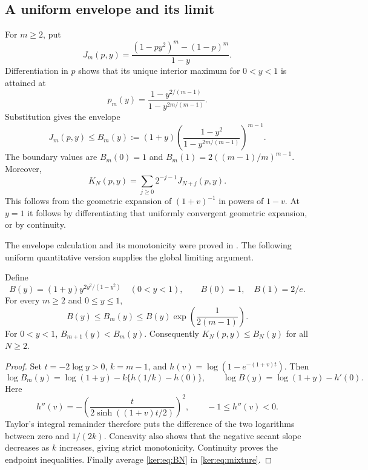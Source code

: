 \subsection{A uniform envelope and its limit}
For $m\ge2$, put
\[
 J_m(p,y)=\frac{(1-py^2)^m-(1-p)^m}{1-y}.
\]
Differentiation in $p$ shows that its unique interior maximum for
$0<y<1$ is attained at
\[
 p_m(y)=\frac{1-y^{2/(m-1)}}{1-y^{2m/(m-1)}}.
\]
Substitution gives the envelope
\begin{equation}\label{ker:eq:BN}
 J_m(p,y)\le B_m(y):=(1+y)
 \left(\frac{1-y^2}{1-y^{2m/(m-1)}}\right)^{m-1}.
\end{equation}
The boundary values are $B_m(0)=1$ and
$B_m(1)=2((m-1)/m)^{m-1}$.
Moreover,
\begin{equation}\label{ker:eq:mixture}
 K_N(p,y)=\sum_{j\ge0}2^{-j-1}J_{N+j}(p,y).
\end{equation}
This follows from the geometric expansion of $(1+v)^{-1}$ in powers
of $1-v$. At $y=1$ it follows by differentiating that uniformly
convergent geometric expansion, or by continuity.

The envelope calculation and its monotonicity were proved in
\cite[Section 3]{IncomingSharp}. The following uniform quantitative
version supplies the global limiting argument.

\begin{lemma}\label{ker:lem:envelope}
Define
\begin{equation}\label{ker:eq:B}
 B(y)=(1+y)y^{2y^2/(1-y^2)}\quad(0<y<1),
 \qquad B(0)=1,\quad B(1)=2/e.
\end{equation}
For every $m\ge2$ and $0\le y\le1$,
\begin{equation}\label{ker:eq:uniform-envelope}
 B(y)\le B_m(y)\le B(y)\exp\!\left(\frac1{2(m-1)}\right).
\end{equation}
For $0<y<1$, $B_{m+1}(y)<B_m(y)$. Consequently
$K_N(p,y)\le B_N(y)$ for all $N\ge2$.
\end{lemma}
\begin{proof}
Set $t=-2\log y>0$, $k=m-1$, and
$h(v)=\log(1-e^{-(1+v)t})$. Then
\[
 \log B_m(y)=\log(1+y)-k\{h(1/k)-h(0)\},
 \qquad \log B(y)=\log(1+y)-h'(0).
\]
Here
\[
 h''(v)=-\left(\frac{t}{2\sinh((1+v)t/2)}\right)^2,
 \qquad -1\le h''(v)<0.
\]
Taylor's integral remainder therefore puts the difference of the two
logarithms between zero and $1/(2k)$. Concavity also shows that the
negative secant slope decreases as $k$ increases, giving strict
monotonicity. Continuity proves the endpoint inequalities.
Finally average \eqref{ker:eq:BN} in \eqref{ker:eq:mixture}.
\end{proof}


